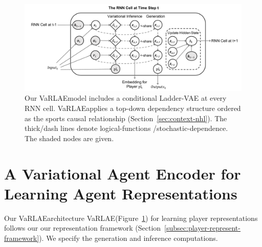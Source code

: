 \documentclass{article}
\newcommand{\latentvariables}{\mathbf{z}}
\newcommand{\state}{\mathbf{s}}
\newcommand{\action}{\mathbf{a}}
\newcommand{\reward}{\boldsymbol{r}}
\newcommand{\system}{VaRLAE\;}
\begin{document}

\begin{figure}[!htbp]
    \centering
    \includegraphics[width=1\columnwidth]{figures/clvrnn-graph.pdf}
    \caption{Our \system model includes a conditional Ladder-VAE at every RNN cell. \system applies a top-down dependency structure
    ordered as the sports causal relationship (Section~\ref{sec:context-nhl}).
    The thick/dash lines denote logical-functions /stochastic-dependence. The shaded nodes are given.
    }
    \label{fig:varlae-graphical-model}
\end{figure}

\section{A Variational Agent Encoder for Learning Agent Representations}
Our \system architecture \system (Figure~\ref{fig:varlae-graphical-model}) for learning player representations follows our our representation framework (Section~\ref{subsec:player-represent-framework}). 
We specify the generation and inference computations.
\end{document}
